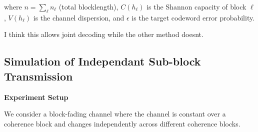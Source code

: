 \documentclass[a4paper, 12pt, onecolumn, journal, twoside, draftclsnofoot]{IEEEtran}
\begin{document}
where $n = \sum_{\ell} n_\ell$ (total blocklength), $C(h_\ell)$ is the Shannon capacity of block $\ell$, $V(h_\ell)$ is the channel dispersion, and $\epsilon$ is the target codeword error probability.

I think this allows joint decoding while the other method doesnt.

\newpage
\subsection{Simulation of Independant Sub-block Transmission}
\textbf{Experiment Setup}

We consider a block-fading channel where the channel is constant over a coherence block and changes independently across different coherence blocks.
\end{document}
